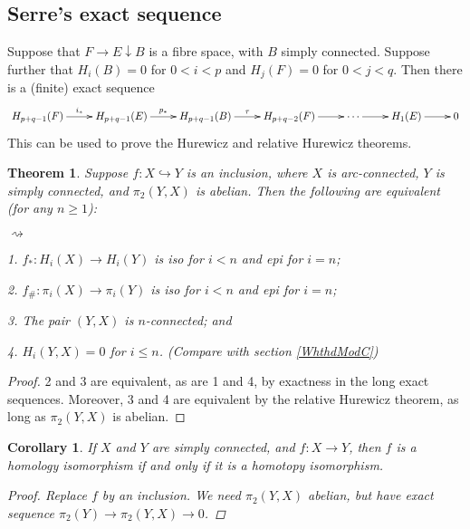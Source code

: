 \documentclass[11pt]{article}
\theoremstyle{plain}
\newtheorem*{thm*}{Theorem}
\newtheorem*{cor*}{Corollary}
\theoremstyle{definition}
\renewcommand{\to}{\longrightarrow}
\newenvironment{itemise}{
\begin{list}{\textup{$\rightsquigarrow$}}
   {
      \setlength{\topsep}{.1cm}
      \setlength{\itemsep}{1pt}
      \setlength{\parskip}{0pt}
      \setlength{\parsep}{0pt}
   }
}{\end{list}\vspace{-.2cm}}
\begin{document}
\subsection{Serre's exact sequence}
Suppose that $F\rightarrow E\downarrow B$ is a fibre space, with $B$ simply connected. Suppose further that $H_i(B)=0$ for $0<i<p$ and $H_j(F)=0$ for $0<j<q$. Then there is a (finite) exact sequence
\[\xymatrix{
H_{p+q-1}(F)\ar[r]^{i_*}&H_{p+q-1}(E)\ar[r]^{p_*}&H_{p+q-1}(B)\ar[r]^{\tau}&H_{p+q-2}(F)\ar[r]&\cdots\ar[r]&H_1(E)\ar[r]&0
}\]
This can be used to prove the Hurewicz and relative Hurewicz theorems.
\begin{thm*}\label{Whthd}
Suppose $f:X\hookrightarrow Y$ is an inclusion, where $X$ is arc-connected, $Y$ is simply connected, and $\pi_2(Y,X)$ is abelian. Then the following are equivalent (for any $n\geq1$):
\begin{itemise}
\item[1.] $f_*:H_i(X)\to H_i(Y)$ is iso for $i<n$ and epi for $i=n$;
\item[2.] $f_\#:\pi_i(X)\to \pi_i(Y)$ is iso for $i<n$ and epi for $i=n$;
\item[3.] The pair $(Y,X)$ is $n$-connected; and
\item[4.] $H_i(Y,X)=0$ for $i\leq n$. \hfill (Compare with section \ref{WhthdModC})
\end{itemise}
\end{thm*}
\begin{proof}
2 and 3 are equivalent, as are 1 and 4, by exactness in the long exact sequences. Moreover, 3 and 4 are equivalent by the relative Hurewicz theorem, as long as $\pi_2(Y,X)$ is abelian.
\end{proof}
\begin{cor*} If $X$ and $Y$ are simply connected, and $f:X\to Y$, then $f$ is a homology isomorphism if and only if it is a homotopy isomorphism.
\begin{proof}
Replace $f$ by an inclusion. We need $\pi_2(Y,X)$ abelian, but have exact sequence $\pi_2(Y)\to\pi_2(Y,X)\to0$.
\end{proof}
\end{cor*}
\setcounter{subsection}{5}
\end{document}
